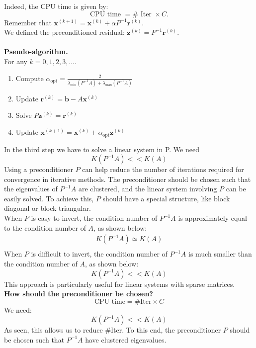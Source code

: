 \documentclass[11pt]{book}
\begin{document}
Indeed, the CPU time is given by:
$$
\mathrm{CPU} \text { time }=\# \text { Iter } \times C.
$$
Remember that $\boldsymbol{x}^{(k+1)}=\boldsymbol{x}^{(k)}+\alpha P^{-1} \boldsymbol{r}^{(k)}$.\\
We defined the preconditioned residual: $\boldsymbol{z}^{(k)}=P^{-1} \boldsymbol{r}^{(k)}$.\\ \\
\textbf{Pseudo-algorithm.}\\
For any $k=0,1,2,3, \ldots$.
\begin{enumerate}
\item Compute $\alpha_{\text{opt}}=\frac{2}{\lambda_{\min}\left(P^{-1} A\right)+\lambda_{\max}\left(P^{-1} A\right)}$
\item Update $\boldsymbol{r}^{(k)}=\boldsymbol{b}-A \boldsymbol{x}^{(k)}$
\item Solve $P \boldsymbol{z}^{(k)}=\boldsymbol{r}^{(k)}$
\item Update $\boldsymbol{x}^{(k+1)}=\boldsymbol{x}^{(k)}+\alpha_{\text{opt}} \boldsymbol{z}^{(k)}$
\end{enumerate}
In the third step we have to solve a linear system in P. We need
$$
K\left(P^{-1} A\right)<<K(A)
$$
Using a preconditioner $P$ can help reduce the number of iterations required for convergence in iterative methods. The preconditioner should be chosen such that the eigenvalues of $P^{-1}A$ are clustered, and the linear system involving $P$ can be easily solved. To achieve this, $P$ should have a special structure, like block diagonal or block triangular.\\
When $P$ is easy to invert, the condition number of $P^{-1}A$ is approximately equal to the condition number of $A$, as shown below:
$$
\begin{gathered}
K\left(P^{-1} A\right) \simeq K(A) \\
\end{gathered}
$$
When $P$ is difficult to invert, the condition number of $P^{-1}A$ is much smaller than the condition number of $A$, as shown below:
$$
{K\left(P^{-1} A\right)<<K(A)}
$$
This approach is particularly useful for linear systems with sparse matrices. \\
\textbf{How should the preconditioner be chosen?}
\begin{equation}
\text{CPU time} = \text{\#Iter} \times C
\end{equation}
We need:
\begin{equation}
K(P^{-1}A) << K(A)
\end{equation}
As seen, this allows us to reduce \#Iter. To this end, the preconditioner $P$ should be chosen such that $P^{-1}A$ have clustered eigenvalues. \\
\end{document}
